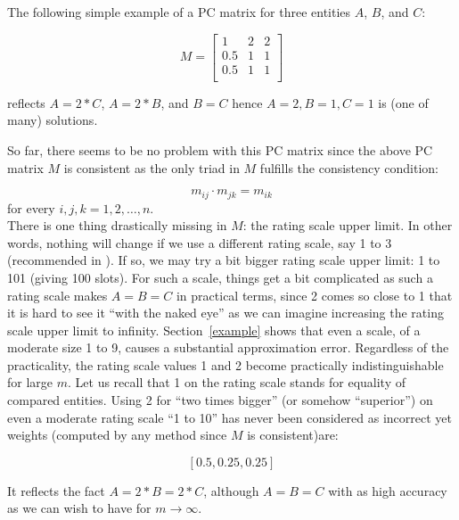 \documentclass [12pt]{article}
\begin{document}
\noindent The following simple example of a PC matrix for three entities $A$, $B$, and $C$:

\begin{displaymath}
M = \begin{bmatrix}
    1     & 2     & 2 \\
    0.5   & 1     & 1 \\
    0.5   & 1     & 1 \\
\end{bmatrix}
\label{M221}
\end{displaymath}

\noindent reflects $A=2*C$, $A=2*B$, and $B=C$ hence $A=2, B=1, C=1$ is (one of many) solutions.

So far, there seems to be no problem with this PC matrix since the above PC matrix $M$ is consistent as the only triad in $M$ fulfills the consistency condition: 

\begin{equation}\label{cc} m_{ij} \cdot m_{jk}=m_{ik}\end{equation}
for every $i,j,k=1,2, \ldots ,n$. \\
 


There is one thing drastically missing in $M$: the rating scale upper limit. In other words, nothing will change if we use a different rating scale, say 1 to 3 (recommended in \cite{FKS2010}). If so, we may try a bit bigger rating scale upper limit: 1 to 101 (giving 100 slots). For such a scale, things get a bit complicated as such a rating scale makes $A=B=C$ in practical terms, since 2 comes so close to 1 that it is hard to see it ``with the naked eye'' as we can imagine increasing the rating scale upper limit to infinity. Section~\ref{example} shows that even a scale, of a moderate size 1 to 9, causes a substantial approximation error. 
Regardless of the practicality, the rating scale values 1 and 2 become practically indistinguishable for large $m$. Let us recall that 1 on the rating scale stands for equality of compared entities. Using 2 for ``two times bigger'' (or somehow ``superior'') on even a moderate rating scale ``1 to 10'' 
has never been considered as incorrect yet weights (computed by any method since $M$ is consistent)are: 

$$[0.5, 0.25, 0.25]$$ 

\noindent It reflects the fact $A=2*B=2*C$, although $A=B=C$ with as high accuracy as we can wish to have for $m \rightarrow \infty$. \\
\end{document}
